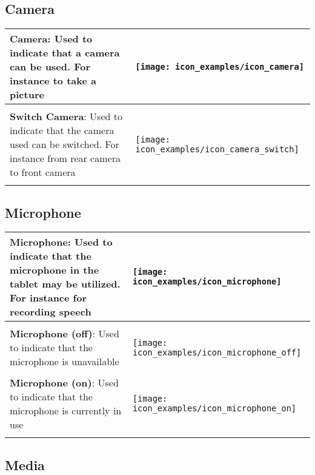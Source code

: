 \subsection{Camera}

\begin{longtable}{m{\textwidth-2.2cm} m{1.5cm}}
	\textbf{Camera}: Used to indicate that a camera can be used. For instance to take a picture & \parbox[c]{1.2cm}{
	\texttt{[image: icon\_examples/icon\_camera]}} \\[0.6cm] \hline \\[-0.6em] 

	\textbf{Switch Camera}: Used to indicate that the camera used can be switched. For instance from rear camera to front camera & \parbox[c]{1.7cm}{
	\texttt{[image: icon\_examples/icon\_camera\_switch]}} \\[0.6cm] \hline \\[-0.6em] 
\end{longtable}


\subsection{Microphone}

\begin{longtable}{m{\textwidth-2.2cm} m{1.5cm}}
	\textbf{Microphone}: Used to indicate that the microphone in the tablet may be utilized. For instance for recording speech & \parbox[c]{1.2cm}{
	\texttt{[image: icon\_examples/icon\_microphone]}} \\[0.6cm] \hline \\[-0.6em]

	\textbf{Microphone (off)}: Used to indicate that the microphone is unavailable & \parbox[c]{1.2cm}{
	\texttt{[image: icon\_examples/icon\_microphone\_off]}} \\[0.6cm] \hline \\[-0.6em]

	\textbf{Microphone (on)}: Used to indicate that the microphone is currently in use & \parbox[c]{1.2cm}{
	\texttt{[image: icon\_examples/icon\_microphone\_on]}} \\[0.6cm] \hline \\[-0.6em] 
\end{longtable}


\subsection{Media}

